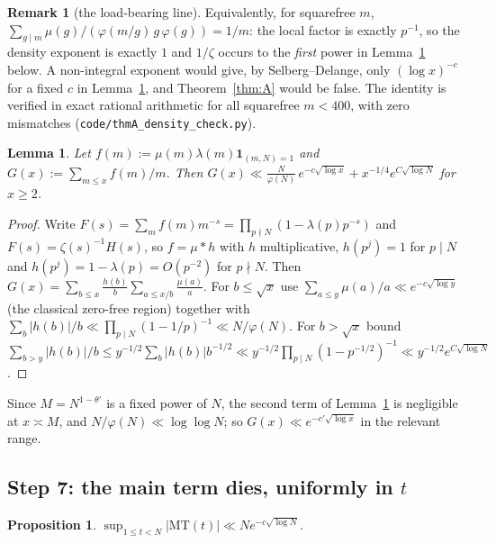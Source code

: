 \documentclass[11pt,a4paper]{article}
\theoremstyle{plain}
\newtheorem{lemma}[theorem]{Lemma}
\newtheorem{proposition}[theorem]{Proposition}
\theoremstyle{definition}
\newtheorem{remark}[theorem]{Remark}
\begin{document}
\begin{remark}[the load-bearing line]\label{rem:loadbearing}
Equivalently, for squarefree $m$,
$\sum_{g\mid m}\mu(g)/(\varphi(m/g)\,g\,\varphi(g))=1/m$: the local
factor is exactly $p^{-1}$, so the density exponent is exactly $1$ and
$1/\zeta$ occurs to the \emph{first} power in Lemma~\ref{lem:mu}
below. A non-integral exponent would give, by Selberg--Delange, only
$(\log x)^{-c}$ for a fixed $c$ in Lemma~\ref{lem:mu}, and
Theorem~\ref{thm:A} would be false. The identity is verified in exact
rational arithmetic for all squarefree $m<400$, with zero mismatches
(\texttt{code/thmA\_density\_check.py}).
\end{remark}

\begin{lemma}\label{lem:mu}
Let $f(m):=\mu(m)\lambda(m)\mathbf 1_{(m,N)=1}$ and
$G(x):=\sum_{m\le x}f(m)/m$. Then
$G(x)\ll \frac{N}{\varphi(N)}\,e^{-c\sqrt{\log x}}
 + x^{-1/4}e^{C\sqrt{\log N}}$
for $x\ge2$.
\end{lemma}

\begin{proof}
Write $F(s)=\sum_m f(m)m^{-s}=\prod_{p\nmid N}(1-\lambda(p)p^{-s})$ and
$F(s)=\zeta(s)^{-1}H(s)$, so $f=\mu*h$ with $h$ multiplicative,
$h(p^j)=1$ for $p\mid N$ and $h(p^j)=1-\lambda(p)=O(p^{-2})$ for
$p\nmid N$. Then
$G(x)=\sum_{b\le x}\frac{h(b)}{b}\sum_{a\le x/b}\frac{\mu(a)}{a}$.
For $b\le\sqrt x$ use
$\sum_{a\le y}\mu(a)/a\ll e^{-c\sqrt{\log y}}$ (the classical
zero-free region) together with
$\sum_b|h(b)|/b\ll\prod_{p\mid N}(1-1/p)^{-1}\ll N/\varphi(N)$. For
$b>\sqrt x$ bound $\sum_{b>y}|h(b)|/b\le
y^{-1/2}\sum_b|h(b)|b^{-1/2}\ll y^{-1/2}\prod_{p\mid N}(1-p^{-1/2})^{-1}
\ll y^{-1/2}e^{C\sqrt{\log N}}$.
\end{proof}

Since $M=N^{1-\theta'}$ is a fixed power of $N$, the second term of
Lemma~\ref{lem:mu} is negligible at $x\asymp M$, and
$N/\varphi(N)\ll\log\log N$; so $G(x)\ll e^{-c'\sqrt{\log x}}$ in the
relevant range.

\subsection{Step 7: the main term dies, uniformly in $t$}

\begin{proposition}\label{prop:MT}
$\displaystyle \sup_{1\le t<N}|\mathrm{MT}(t)|\ll N e^{-c\sqrt{\log N}}$.
\end{proposition}
\end{document}
